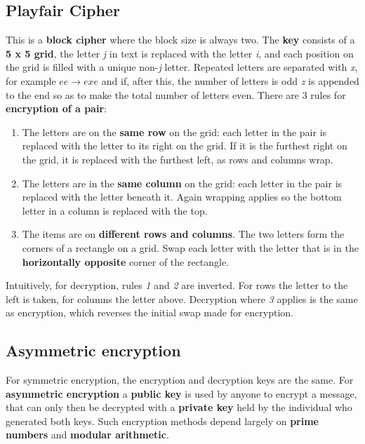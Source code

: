 \documentclass[final]{article}
\begin{document}
\subsection{Playfair Cipher}
This is a \textbf{block cipher} where the block size is always two. The \textbf{key} consists of a \textbf{5 x 5 grid}, the letter \textit{j} in text is replaced with the letter \textit{i}, and each position on the grid is filled with a unique non-\textit{j} letter. Repeated letters are separated with \textit{x}, for example $ ee \rightarrow exe $ and if, after this, the number of letters is odd \textit{z} is appended to the end so as to make the total number of letters even. There are 3 rules for \textbf{encryption of a pair}:
\begin{enumerate}
	\item The letters are on the \textbf{same row} on the grid: each letter in the pair is replaced with the letter to its right on the grid. If it is the furthest right on the grid, it is replaced with the furthest left, as rows and columns wrap.
	\item The letters are in the \textbf{same column} on the grid: each letter in the pair is replaced with the letter beneath it. Again wrapping applies so the bottom letter in a column is replaced with the top.
	\item The items are on \textbf{different rows and columns}. The two letters form the corners of a rectangle on a grid. Swap each letter with the letter that is in the \textbf{horizontally opposite} corner of the rectangle.
\end{enumerate}
Intuitively, for decryption, rules \textit{1} and \textit{2} are inverted. For rows the letter to the left is taken, for columns the letter above. Decryption where \textit{3} applies is the same as encryption, which reverses the initial swap made for encryption.

\subsection{Asymmetric encryption}
For symmetric encryption, the encryption and decryption keys are the same. For \textbf{asymmetric encryption} a \textbf{public key} is used by anyone to encrypt a message, that can only then be decrypted with a \textbf{private key} held by the individual who generated both keys. Such encryption methods depend largely on \textbf{prime numbers} and \textbf{modular arithmetic}.
\end{document}
